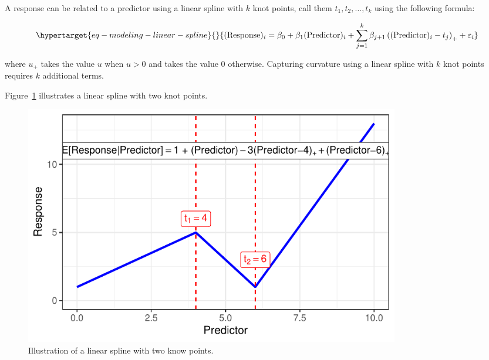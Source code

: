\documentclass[
  letterpaper,
  DIV=11,
  numbers=noendperiod]{scrreprt}
\theoremstyle{definition}
\theoremstyle{definition}
\theoremstyle{remark}
\begin{document}
\begin{tcolorbox}[enhanced jigsaw, bottomrule=.15mm, titlerule=0mm, bottomtitle=1mm, colback=white, coltitle=black, rightrule=.15mm, leftrule=.75mm, toprule=.15mm, toptitle=1mm, left=2mm, opacityback=0, colframe=quarto-callout-note-color-frame, breakable, title=\textcolor{quarto-callout-note-color}{\faInfo}\hspace{0.5em}{Formula for Linear Spline}, arc=.35mm, colbacktitle=quarto-callout-note-color!10!white, opacitybacktitle=0.6]

A response can be related to a predictor using a linear spline with
\(k\) knot points, call them \(t_1, t_2, \dotsc, t_k\) using the
following formula:

\begin{equation}\protect\hypertarget{eq-modeling-linear-spline}{}{(\text{Response})_i = \beta_0 + \beta_1 (\text{Predictor})_i + \sum_{j=1}^{k} \beta_{j+1} \left((\text{Predictor})_i - t_j\right)_{+} + \varepsilon_i}\label{eq-modeling-linear-spline}\end{equation}

where \(u_{+}\) takes the value \(u\) when \(u > 0\) and takes the value
0 otherwise. Capturing curvature using a linear spline with \(k\) knot
points requires \(k\) additional terms.

\end{tcolorbox}

Figure~\ref{fig-modeling-splines-linear-spline} illustrates a linear
spline with two knot points.

\begin{figure}

{\centering \includegraphics[width=0.8\textwidth,height=\textheight]{./images/fig-modeling-splines-linear-spline-1.pdf}

}

\caption{\label{fig-modeling-splines-linear-spline}Illustration of a
linear spline with two know points.}

\end{figure}
\end{document}
